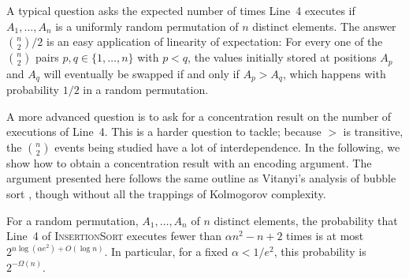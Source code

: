 \documentclass[lotsofwhite]{patmorin}
\begin{document}
A typical question asks the expected number of times Line~4 executes
if $A_1,\ldots,A_n$ is a uniformly random permutation of $n$ distinct
elements.  The answer $\binom{n}{2}/2$ is an easy application of
linearity of expectation: For every one of the $\binom{n}{2}$ pairs
$p,q\in\{1,\ldots,n\}$ with $p<q$, the values initially stored at
positions $A_p$ and $A_q$ will eventually be swapped if and only if $A_p >
A_q$, which happens with probability $1/2$ in a random permutation.

A more advanced question is to ask for a concentration result on the
number of executions of Line~4. This is a harder question to tackle;
because $>$ is transitive, the $\binom{n}{2}$ events being studied have
a lot of interdependence. In the following, we show how to obtain a
concentration result with an encoding argument.  The argument presented
here follows the same outline as Vitanyi's analysis of bubble sort
\cite{vitanyi:analysis}, though without all the trappings of Kolmogorov complexity.

\begin{thm}
  For a random permutation, $A_1,\ldots,A_n$ of $n$ distinct elements,
  the probability that Line~4 of \textsc{InsertionSort} executes fewer
  than $\alpha n^2 - n + 2$ times is at most $2^{n\log(\alpha e^2)+O(\log
  n)}$.  In particular, for a fixed $\alpha < 1/e^2$, this probability
  is $2^{-\Omega(n)}$.
\end{thm}
\end{document}
